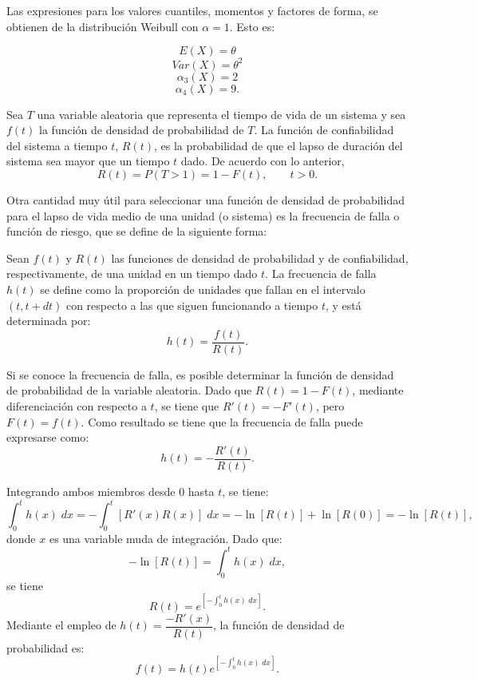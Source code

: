 Las expresiones para los valores cuantiles, momentos y factores de forma, se obtienen de la distribución Weibull con $\alpha=1$. Esto es:

\begin{tcolorbox}
    $$E(X)=\theta$$
    $$Var(X)=\theta^2$$
    $$\alpha_3(X)=2$$
    $$\alpha_4(X)=9.$$
\end{tcolorbox}

\begin{tcolorbox}
    \begin{def.}
	Sea $T$ una variable aleatoria que representa el tiempo de vida de un sistema y sea $f(t)$ la función de densidad de probabilidad de $T$. La función de confiabilidad del sistema a tiempo $t$, $R(t)$, es la probabilidad de que el lapso de duración del sistema sea mayor que un tiempo $t$ dado. De acuerdo con lo anterior,
	$$R(t)=P(T>1)=1-F(t),\qquad t>0.$$
    \end{def.}
\end{tcolorbox}

Otra cantidad muy útil para seleccionar una función de densidad de probabilidad para el lapso de vida medio de una unidad (o sistema) es la frecuencia de falla o función de riesgo, que se define de la siguiente forma:

\begin{tcolorbox}
    \begin{def.}
	Sean $f(t)$ y $R(t)$ las funciones de densidad de probabilidad y de confiabilidad, respectivamente, de una unidad en un tiempo dado $t$. La frecuencia de falla $h(t)$ se define como la proporción de unidades que fallan en el intervalo $(t,t+dt)$ con respecto a las que siguen funcionando a tiempo $t$, y está determinada por:
	$$h(t)=\dfrac{f(t)}{R(t)}.$$
    \end{def.}
\end{tcolorbox}

Si se conoce la frecuencia de falla, es posible determinar la función de densidad de probabilidad de la variable aleatoria. Dado que $R(t)=1-F(t)$, mediante diferenciación con respecto a $t$, se tiene que $R'(t)=-F'(t)$, pero $F(t)=f(t)$. Como resultado se tiene que la frecuencia de falla puede expresarse como:
$$h(t)=-\dfrac{R'(t)}{R(t)}.$$

Integrando ambos miembros desde $0$ hasta $t$, se tiene:
$$\int_0^t h(x)\; dx = -\int_0^t \left[R'(x)R(x)\right]\; dx = - \ln\left[R(t)\right]+\ln\left[R(0)\right] = -\ln\left[R(t)\right],$$
donde $x$ es una variable muda de integración. Dado que:
$$-\ln\left[R(t)\right]=\int_0^t h(x)\; dx,$$
se tiene
$$R(t)=e^{\left[-\int_0^t h(x)\; dx\right]}.$$
Mediante el empleo de $h(t)=\dfrac{-R'(x)}{R(t)}$, la función de densidad de probabilidad es:
$$f(t)=h(t)e^{\left[-\int_0^t h(x)\; dx\right]}.$$

